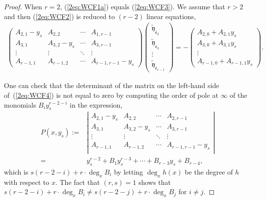 \documentclass[pdftex]{sigma}
\def\tfy{{\widetilde{\mathfrak y}}}
\def\Bfe{{\overline{\mathfrak e}}}
\numberwithin{equation}{section}
\begin{document}
\begin{proof}
When $r = 2$, (\ref{2eq:WCF1a}) equals (\ref{2eq:WCF3}).
We assume that $r>2$ and then (\ref{2eq:WCF2}) is reduced to $(r-2)$ linear equations,
\begin{gather}
\begin{pmatrix}
A_{2,1} - y_s & A_{2,2} & \cdots & A_{1,r-1}\\
A_{3,1} & A_{3,2} - y_s& \cdots & A_{3,r-1}\\
\vdots & \vdots & \ddots & \vdots \\
A_{r-1,1} & A_{r-1,2} & \cdots & A_{r-1,r-1} - y_s
\end{pmatrix}
\begin{pmatrix}
\tfy_{\Bfe_2}\\
\tfy_{\Bfe_3}\\
\vdots\\
\tfy_{\Bfe_{r-1}}
\end{pmatrix}
=-
\begin{pmatrix}
A_{2,0} + A_{2, 1} y_s\\
A_{3,0} + A_{3, 1} y_s\\
\vdots\\
A_{r-1,0} + A_{r-1, 1} y_s
\end{pmatrix}.\label{2eq:WCF4}
\end{gather}

One can check that the determinant of the matrix on the left-hand side of~(\ref{2eq:WCF4}) is not equal to zero by computing the order of pole at $\infty$ of
the monomials $B_{i} y_s^{r-2-i}$ in the expression,
\begin{align*}
P(x, y_s):={}& \left|
\begin{matrix}
A_{2,1} - y_s & A_{2,2} & \cdots & A_{2,r-1}\\
A_{3,1} & A_{3,2} - y_s& \cdots & A_{3,r-1}\\
\vdots & \vdots & \ddots & \vdots \\
A_{r-1,1} & A_{r-1,2} & \cdots & A_{r-1,r-1} - y_s\\
\end{matrix}
\right|\\
={}& y_s^{r-2} + B_1 y_s^{r-3} +\cdots
+ B_{r-3} y_s + B_{r-4},
\end{align*}
which is $s (r -2 -i) + r \cdot\deg_x B_i$ by letting $\deg_x h(x)$ be the degree of $h$ with respect to $x$.
The fact that $(r,s)=1$ shows that $s (r -2 -i) + r \cdot\deg_x B_i\neq s (r -2 -j) + r \cdot\deg_x B_j$ for $i\neq j$.


\end{proof}
\end{document}
